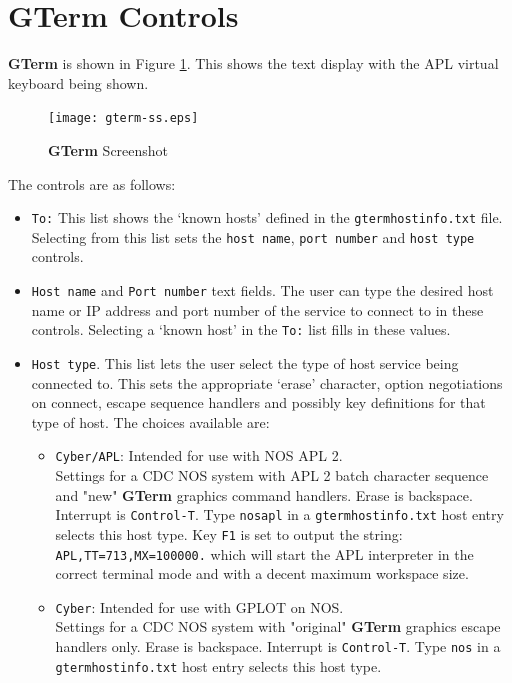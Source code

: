 \documentclass[a4paper,twoside,11pt]{article}
\begin{document}
\section{\textbf{GTerm} Controls}\label{useit}
\textbf{GTerm} is shown in Figure \ref{fig:gtermss}. This shows the text display with the APL virtual keyboard being
shown. 
\begin{figure}
	\centering
		\texttt{[image: gterm-ss.eps]}
	\caption{\textbf{GTerm} Screenshot}
	\label{fig:gtermss}
\end{figure}
The controls are as follows:
\begin{itemize}
\item \texttt{To:} This list shows the `known hosts' defined in the \texttt{gtermhostinfo.txt} file. Selecting
      from this list sets the \texttt{host name}, \texttt{port number} and \texttt{host type} controls.
\item \texttt{Host name} and \texttt{Port number} text fields. The user can type the desired host name or IP address and
      port number of the service to connect to in these controls. Selecting a `known host' in the \texttt{To:} list
      fills in these values.
\item \texttt{Host type}. This list lets the user select the type of host service being connected to. This sets the
      appropriate `erase' character, option negotiations on connect, escape sequence handlers and possibly
      key definitions for that type of host. The choices available are:
      \begin{itemize}
      \item \texttt{Cyber/APL}: Intended for use with NOS APL 2.\\
      	   Settings for a CDC NOS system with APL 2 batch character sequence and "new" \textbf{GTerm}
            graphics command handlers. Erase is backspace. Interrupt is \texttt{Control-T}. Type \texttt{nosapl} in
            a \texttt{gtermhostinfo.txt} host entry selects this host type. Key \texttt{F1} is set to output the
            string: \texttt{APL,TT=713,MX=100000.} which will start the APL interpreter in the correct terminal mode and with
            a decent maximum workspace size.
      \item \texttt{Cyber}: Intended for use with GPLOT on NOS.\\
      	   Settings for a CDC NOS system with "original" \textbf{GTerm}
            graphics escape handlers only.
            Erase is backspace. Interrupt is \texttt{Control-T}. Type \texttt{nos} in
            a \texttt{gtermhostinfo.txt} host entry selects this host type.

\end{itemize}
\end{itemize}
\end{document}
